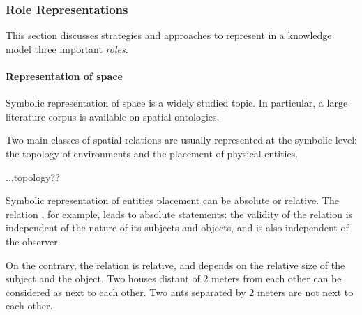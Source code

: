 \subsubsection{Role Representations}

This section discusses strategies and approaches to represent in a knowledge
model three important \emph{roles}.

\begin{scriptsize}
\begin{center}
\end{center}
\end{scriptsize}


\paragraph{Representation of space}

Symbolic representation of space is a widely studied topic. In particular, a
large literature corpus is available on spatial ontologies.

Two main classes of spatial relations are usually represented at the symbolic
level: the topology of environments and the placement of physical entities.

\begin{scriptsize}
\begin{center}
\end{center}
\end{scriptsize}

...topology??

Symbolic representation of entities placement can be absolute or relative. The
relation , for example, leads to absolute statements: the
validity of the relation is independent of the nature of its subjects and
objects, and is also independent of the observer.

On the contrary, the relation  is relative, and depends on the
relative size of the subject and the object. Two houses distant of 2 meters
from each other can be considered as next to each other. Two ants separated by
2 meters are not next to each other.

